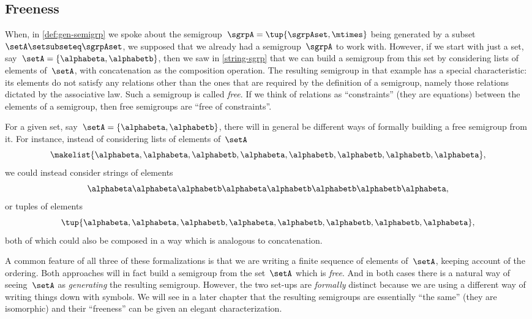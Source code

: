 \subsection{Freeness}

When, in \cref{def:gen-semigrp} we spoke about the semigroup~$\sgrpA = \tup{\sgrpAset, \mtimes}$  being generated by a subset~$\setA \setsubseteq \sgrpAset$, we supposed that we already had a semigroup~$\sgrpA$ to work with.
However, if we start with just a set, say~$\setA = \{ \alphabeta, \alphabetb\}$, then we saw in \cref{string-sgrp} that we can build a semigroup from this set by considering lists of elements of~$\setA$, with concatenation as the composition operation.
The resulting semigroup in that example has a special characteristic: its elements do not satisfy any relations other than the ones that are required by the definition of a semigroup, namely those relations dictated by the associative law.
Such a semigroup is called \emph{free}.
If we think of relations as ``constraints'' (they are equations) between the elements of a semigroup, then free semigroups are ``free of constraints''.

For a given set, say~$\setA = \{ \alphabeta, \alphabetb\}$, there will in general be different ways of formally building a free semigroup from it.
For instance, instead of considering lists of elements of~$\setA$
\begin{equation}
    \makelist{\alphabeta,\alphabeta, \alphabetb, \alphabeta, \alphabetb, \alphabetb, \alphabetb, \alphabeta},
\end{equation}
we could instead consider strings of elements
\begin{equation}
    \alphabeta\alphabeta \alphabetb \alphabeta \alphabetb \alphabetb \alphabetb \alphabeta,
\end{equation}
or tuples of elements
\begin{equation}
    \tup{ \alphabeta, \alphabeta,  \alphabetb,  \alphabeta,  \alphabetb,  \alphabetb,  \alphabetb,  \alphabeta},
\end{equation}
both of which could also be composed in a way which is analogous to concatenation.

A common feature of all three of these formalizations is that we are writing a finite sequence of elements of~$\setA$, keeping account of the ordering.
Both approaches will in fact build a semigroup from the set~$\setA$ which is \emph{free}.
And in both cases there is a natural way of seeing~$\setA$ as \emph{generating} the resulting semigroup.
However, the two set-ups are \emph{formally} distinct because we are using a different way of writing things down with symbols.
We will see in a later chapter that the resulting semigroups are essentially ``the same'' (they are isomorphic) and their ``freeness'' can be given an elegant characterization.

